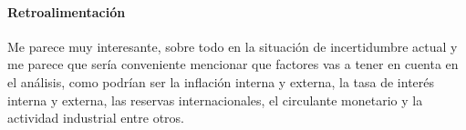 \documentclass{article}
\begin{document}
\paragraph{Retroalimentación}
 Me parece muy interesante, sobre todo en la situación de incertidumbre actual y me parece que sería conveniente mencionar que factores vas a tener en cuenta en el análisis, como podrían ser la inflación interna  y externa, la  tasa de interés interna y externa, las reservas internacionales, el circulante monetario y la actividad industrial entre otros.
\end{document}
